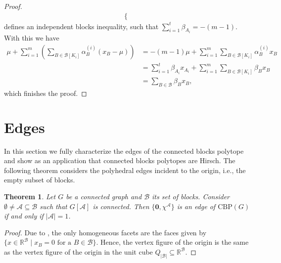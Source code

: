 \documentclass[12pt]{amsart}
\newtheorem{theorem}{Theorem}[section]
\newcommand{\R}{\mathbb{R}}
\newcommand{\CBP}{\mathrm{CBP}}
\newcommand{\B}{\mathcal{B}}
\newcommand{\A}{\mathcal{A}}
\renewcommand{\H}{\mathcal{H}}
\begin{document}
\begin{proof}
\begin{align*}
\begin{cases}
        \end{cases}
    \end{align*}
	defines an independent blocks inequality, such that $\sum_{i=1}^t \beta_{A_i}=-(m-1)$. With this we have
    \begin{align*}
        \mu+\sum_{i=1}^m \left(\sum_{B \in \B[K_i]} \alpha^{(i)}_B(x_B-\mu)\right)&=-(m-1)\mu+\sum_{i=1}^m\sum_{B \in \B[K_i]} \alpha^{(i)}_Bx_B \\
        &=\sum_{i=1}^t \beta_{A_i}x_{A_i}+\sum_{i=1}^m\sum_{B \in \B[K_i]} \beta_Bx_B  \\
        &=\sum_{B \in \B}\beta_Bx_B,
    \end{align*}
	which finishes the proof.
\end{proof}

\section{Edges}
\label{sectionEdges}

In this section we fully characterize the edges of the connected blocks polytope and show as an application that connected blocks polytopes are Hirsch. The following theorem considers the polyhedral edges incident to the origin, i.e., the empty subset of blocks.

\begin{theorem}
\label{edgesempty}
    Let $G$ be a connected graph and $\B$ its set of blocks. Consider $\emptyset \neq \A \subseteq \B$ such that $G[\A]$ is connected. Then $\{\textbf{0},\chi^\A\}$ is an edge of $\CBP(G)$ if and only if $\vert \A \vert =1$.
\end{theorem}

\begin{proof}
    
    Due to , the only homogeneous facets are the faces given by $\{x \in \R^\B \mid x_B=0 \text{ for a } B \in \B\}$. Hence, the vertex figure of the origin is the same as the vertex figure of the origin in the unit cube $Q_{\vert \B \vert} \subseteq \R^\B$.
\end{proof}
\end{document}

